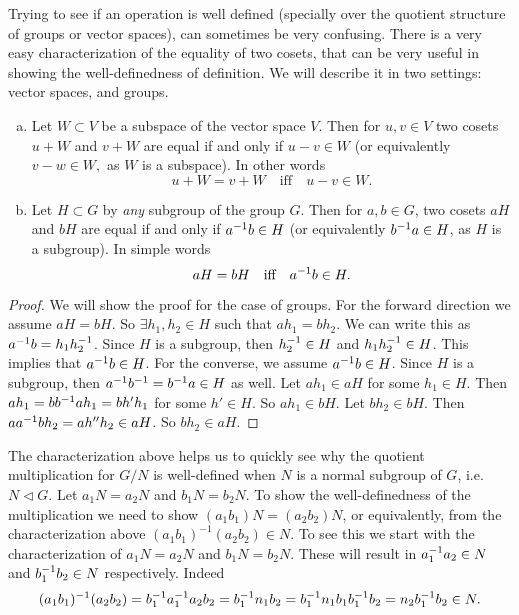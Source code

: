 \begin{observation}
	Trying to see if an operation is well defined (specially over the quotient structure of groups or vector spaces), can sometimes be very confusing. There is a very easy characterization of the equality of two cosets, that can be very useful in showing the well-definedness of definition. We will describe it in two settings: vector spaces, and groups.
	\begin{enumerate}[(a)]
		\item 
		Let $ W \subset V $ be a subspace of the vector space $ V $. Then for $ u,v \in V $ two cosets $ u + W $ and $ v+W $ are equal if and only if $ u-v\in W $ (or equivalently $ v-w\in W, $ as $ W $ is a subspace). In other words
		\[ u + W = v + W \quad \text{iff} \quad u - v \in W. \]
		
		\item Let $ H \subset G $ by \emph{any} subgroup of the group $ G $. Then for $ a,b \in G $, two cosets $ aH $ and $ bH $ are equal if and only if $ a^{-1} b \in H $ (or equivalently $ b^{-1}a \in H $, as $ H $ is a subgroup). In simple words
		\[ aH = bH \quad \text{iff}\quad  a^{-1}b \in H. \]
	\end{enumerate}
	\begin{proof}
		We will show the proof for the case of groups. For the forward direction we assume $ aH = bH $. So $ \exists h_1,h_2 \in H $ such that $ ah_1 = b h_2 $. We can write this as $ a^{-1} b = h_1h_2^{-1} $. Since $ H $ is a subgroup, then $ h_2^{-1}\in H $ and $ h_1h_2^{-1}\in  H $. This implies that $ a^{-1}b \in H $. For the converse, we assume $ a^{-1}b  \in H$. Since $ H $ is a subgroup, then $ a^{-1}b^{-1} = b^{-1}a \in H $ as well. Let $ ah_1 \in aH $ for some $ h_1 \in H $. Then $ ah_1 = bb^{-1}ah_1 = bh'h_1 $ for some $ h'\in H $. So $ ah_1 \in bH $. Let $ bh_2 \in bH $. Then $ aa^{-1}bh_2 = ah''h_2 \in aH $. So $ bh_2 \in aH $.
	\end{proof}
	
	The characterization above helps us to quickly see why the quotient multiplication for $ G/N $ is well-defined when $ N $ is a normal subgroup of $ G $, i.e. $ N \lhd G $. Let $ a_1N = a_2N $ and $ b_1N = b_2N $. To show the well-definedness of the multiplication we need to show $ (a_1b_1)N = (a_2b_2)N $, or equivalently, from the characterization above $ (a_1b_1)^{-1} (a_2b_2)\in N $. To see this we start with the characterization of $ a_1N = a_2N $ and $ b_1N = b_2N $. These will result in $ a_1^{-1}a_2 \in N $ and $ b_1^{-1}b_2 \in N $ respectively. Indeed
	\[ (a_1b_1)^{-1}(a_2b_2) = b_1^{-1}a_1^{-1}a_2b_2 = b_1^{-1} n_1 b_2 = b_1^{-1} n_1 b_1b_1^{-1} b_2 = n_2 b_1^{-1}b_2 \in N.   \]
\end{observation}


